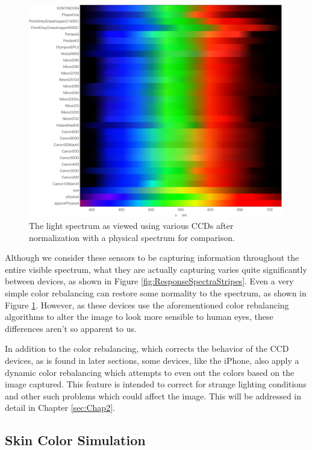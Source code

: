 \begin{figure}[h!]
  \centering
    \includegraphics[width=0.99\textwidth]{Chapter1/Figs/ResponseSpectraStripesNorm.jpg}
    \caption{The light spectrum as viewed using various CCDs after normalization with a physical spectrum for comparison.}  \label{fig:ResponseSpectraStripesNorm}
\end{figure}

Although we consider these sensors to be capturing information throughout the entire visible spectrum, what they are actually capturing varies quite significantly between devices, as shown in Figure \ref{fig:ResponseSpectraStripes}. Even a very simple color rebalancing can restore some normality to the spectrum, as shown in Figure \ref{fig:ResponseSpectraStripesNorm}. However, as these devices use the aforementioned color rebalancing algorithms to alter the image to look more sensible to human eyes, these differences aren't so apparent to us.

In addition to the color rebalancing, which corrects the behavior of the CCD devices, as is found in later sections, some devices, like the iPhone, also apply a dynamic color rebalancing which attempts to even out the colors based on the image captured. This feature is intended to correct for strange lighting conditions and other such problems which could affect the image. This will be addressed in detail in Chapter \ref{sec:Chap2}.


\subsection{Skin Color Simulation} \label{sec:SkinColorSimulation}

